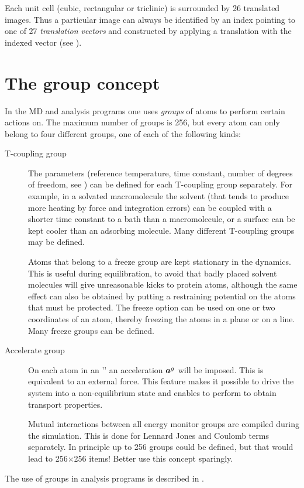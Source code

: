 Each unit cell (cubic, rectangular or triclinic)
is surrounded by 26 translated images. Thus a
particular image can always be identified by an index pointing to one
of 27 {\em translation vectors} and constructed by applying a
translation with the indexed vector (see ).


\section{The group concept}
\label{sec:group}
In the {\gromacs} MD and analysis programs one uses {\em groups} of
atoms to perform certain actions on. The maximum number of groups is
256, but every atom can only belong to four different groups, one of
each of the following kinds:
\begin{description}
\item[T-coupling group]
The  parameters (reference
temperature, time constant, number of degrees of freedom, see
) can be defined for each T-coupling group
separately. For example, in a solvated macromolecule the solvent (that
tends to produce more heating by force and integration errors) can be
coupled with a shorter time constant to a bath than a macromolecule,
or a surface can be kept cooler than an adsorbing molecule. Many
different T-coupling groups may be defined.
\item[]
Atoms that belong to a freeze group are kept stationary in the
dynamics. This is useful during equilibration, {\eg} to avoid that badly
placed solvent molecules will give unreasonable kicks to  protein atoms,
although the same effect can also be obtained by putting a restraining
potential on the atoms that must be protected. The freeze option can be
used on one or two coordinates of an atom, thereby freezing the atoms
in a plane or on a line. Many freeze groups can be defined.
\item[Accelerate group]
On each atom in an '' an acceleration
$\mbox{\boldmath ${a}$}^g$ will be imposed. This is equivalent to an external
force. This feature makes it possible to drive the system into a
non-equilibrium state and enables to perform
 to obtain transport properties.
\item[]
Mutual interactions between all energy monitor groups are compiled
during the simulation. This is done for Lennard Jones and Coulomb
terms separately.  In principle up to 256 groups could be defined, but
that would lead to 256$\times$256 items! Better use this concept
sparingly.
\end{description}
The use of groups in analysis programs is described in
.

